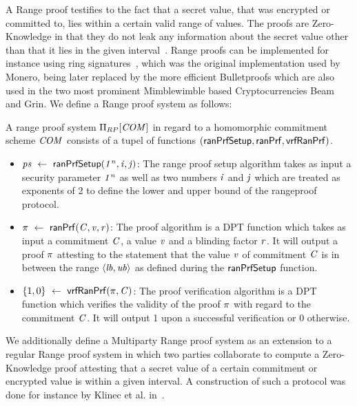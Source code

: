 A Range proof testifies to the fact that a secret value, that was encrypted or committed to, lies within a certain valid range of values.
The proofs are Zero-Knowledge in that they do not leak any information about the secret value other than that it lies in the given interval~\cite{bunz2018bulletproofs}.
Range proofs can be implemented for instance using ring signatures~\cite{noether2016ring}, which was the original implementation used by Monero, being later replaced by the more efficient Bulletproofs\cite{bunz2018bulletproofs} which are also used in the two most prominent Mimblewimble based Cryptocurrencies Beam and Grin.
We define a Range proof system as follows:

\begin{definition}\label{def:pre:rangeproof}
    A range proof system $\Pi_{RP}[\mathit{COM}]$ in regard to a homomorphic commitment scheme $\mathit{COM}$ consists of a tupel of functions $(\mathsf{ranPrfSetup}, \mathsf{ranPrf}, \mathsf{vrfRanPrf})$.
    \begin{itemize}
        \item $\mathit{ps} ~\leftarrow~ \mathsf{ranPrfSetup}(\mathit{1^n},\mathit{i},\mathit{j})$: The range proof setup algorithm takes as input a security parameter $\mathit{1^n}$ as well as two numbers $\mathit{i}$ and $\mathit{j}$ which are treated as exponents of 2 to define the lower and upper bound of the rangeproof protocol.
        \item $\pi ~\leftarrow~ \mathsf{ranPrf}(\mathit{C},\mathit{v},\mathit{r})$: The proof algorithm is a DPT function which takes as input a commitment $\mathit{C}$, a value $\mathit{v}$ and a blinding factor $\mathit{r}$.
        It will output a proof $\pi$ attesting to the statement that the value $\mathit{v}$ of commitment $\mathit{C}$ is in between the range $\langle \mathit{lb}, \mathit{ub} \rangle$ as defined during the $\mathsf{ranPrfSetup}$ function.
        \item $\{1,0\} ~\leftarrow~ \mathsf{vrfRanPrf}(\pi,\mathit{C})$: The proof verification algorithm is a DPT function which verifies the validity of the proof $\pi$ with regard to the commitment $\mathit{C}$.
        It will output 1 upon a successful verification or 0 otherwise.
    \end{itemize}
\end{definition}

We additionally define a Multiparty Range proof system as an extension to a regular Range proof system in which two parties collaborate to compute a Zero-Knowledge proof attesting that a secret value of a certain commitment or encrypted value is within a given interval.
A construction of such a protocol was done for instance by Klinec et al. in~\cite{klinec2020privacy}.

